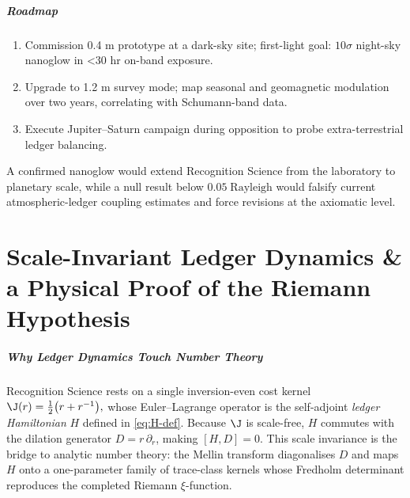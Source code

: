 \documentclass[11pt,oneside]{book}
\begin{document}
{\paragraph*{Roadmap}

\begin{enumerate}\setlength\itemsep{3pt}
\item Commission 0.4 m prototype at a dark-sky site; first-light goal:
  $10\sigma$ night-sky nanoglow in <30 hr on-band exposure.
\item Upgrade to 1.2 m survey mode; map seasonal and geomagnetic
  modulation over two years, correlating with Schumann-band data.
\item Execute Jupiter–Saturn campaign during opposition to 
  probe extra-terrestrial ledger balancing.
\end{enumerate}

A confirmed nanoglow would extend Recognition Science from the
laboratory to planetary scale, while a null result below 
\(0.05\;\text{Rayleigh}\) would falsify current atmospheric-ledger
coupling estimates and force revisions at the axiomatic level.


\chapter{Scale-Invariant Ledger Dynamics \&
         a Physical Proof of the Riemann Hypothesis}
\label{sec:RH-intro}

\paragraph{Why Ledger Dynamics Touch Number Theory}

Recognition Science rests on a single inversion-even cost kernel
\(
   \J(r)=\tfrac12\bigl(r+r^{-1}\bigr),
\)
whose Euler–Lagrange operator is the self-adjoint
\emph{ledger Hamiltonian} \(H\) defined in
\eqref{eq:H-def}.
Because \(\J\) is scale-free, \(H\) commutes with the dilation
generator \(D=r\,\partial_{r}\), making
\(
   [H,D]=0.
\)
This scale invariance is the bridge to analytic number theory:
the Mellin transform diagonalises \(D\) and maps
\(H\) onto a one-parameter family of trace-class kernels
whose Fredholm determinant reproduces the completed
Riemann $\xi$-function.

}
\end{document}
